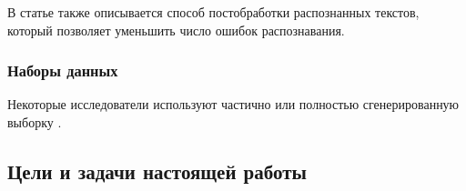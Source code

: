 \documentclass{main.tex}[subfiles]
\begin{document}
В статье \cite{ortoncelli2021} также описывается способ постобработки распознанных текстов, который позволяет уменьшить число ошибок распознавания.

\subsubsection{Наборы данных}

\cite{li2018dsbi}

Некоторые исследователи используют частично или полностью сгенерированную выборку \cite{baumgartner2020app, ortoncelli2021}.

\subsection{Цели и задачи настоящей работы}
\end{document}
